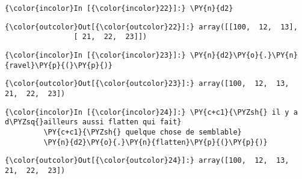     \begin{Verbatim}[commandchars=\\\{\}]
{\color{incolor}In [{\color{incolor}22}]:} \PY{n}{d2}
\end{Verbatim}


\begin{Verbatim}[commandchars=\\\{\}]
{\color{outcolor}Out[{\color{outcolor}22}]:} array([[100,  12,  13],
                [ 21,  22,  23]])
\end{Verbatim}
            
    \begin{Verbatim}[commandchars=\\\{\}]
{\color{incolor}In [{\color{incolor}23}]:} \PY{n}{d2}\PY{o}{.}\PY{n}{ravel}\PY{p}{(}\PY{p}{)}
\end{Verbatim}


\begin{Verbatim}[commandchars=\\\{\}]
{\color{outcolor}Out[{\color{outcolor}23}]:} array([100,  12,  13,  21,  22,  23])
\end{Verbatim}
            
    \begin{Verbatim}[commandchars=\\\{\}]
{\color{incolor}In [{\color{incolor}24}]:} \PY{c+c1}{\PYZsh{} il y a d\PYZsq{}ailleurs aussi flatten qui fait}
         \PY{c+c1}{\PYZsh{} quelque chose de semblable}
         \PY{n}{d2}\PY{o}{.}\PY{n}{flatten}\PY{p}{(}\PY{p}{)}
\end{Verbatim}


\begin{Verbatim}[commandchars=\\\{\}]
{\color{outcolor}Out[{\color{outcolor}24}]:} array([100,  12,  13,  21,  22,  23])
\end{Verbatim}
            

    
    
    
